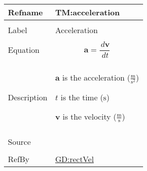 \documentclass[12pt]{article}
\begin{document}
\vspace{\baselineskip}
\noindent
\begin{minipage}{\textwidth}
\begin{tabular}{>{\raggedright}p{}>{\raggedright\arraybackslash}p{}}
\toprule \textbf{Refname} & \textbf{TM:acceleration}
\label{TM:acceleration}
\\ \midrule \\
Label & Acceleration
        
\\ \midrule \\
Equation & \begin{displaymath}
           \mathbf{a}=\frac{\,d\mathbf{v}}{\,dt}
           \end{displaymath}
\\ \midrule \\
Description & \begin{symbDescription}
              \item{$\mathbf{a}$ is the acceleration ($\frac{\text{m}}{\text{s}^{2}}$)}
              \item{$t$ is the time (${\text{s}}$)}
              \item{$\mathbf{v}$ is the velocity ($\frac{\text{m}}{\text{s}}$)}
              \end{symbDescription}
\\ \midrule \\
Source & \cite{accelerationWiki}
         
\\ \midrule \\
RefBy & \hyperref[GD:rectVel]{GD:rectVel}
        
\\ \bottomrule
\end{tabular}
\end{minipage}
\vspace{\baselineskip}
\noindent
\end{document}
